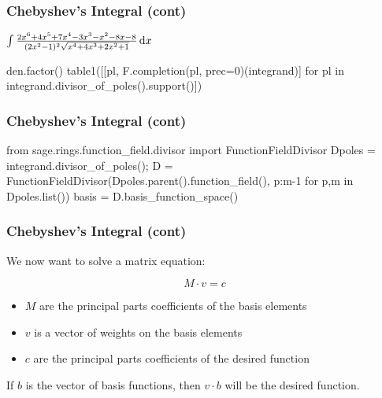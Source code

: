 \documentclass[aspectratio=169,dvipsnames]{beamer}
\newcommand{\ud}{\,\mathrm{d}}
\begin{document}
\begin{frame}[fragile]
\frametitle{Chebyshev's Integral (cont)}
\centerline{$\int {{2x^6+4x^5+7x^4-3x^3-x^2-8x-8}\over{(2x^2-1)^2\sqrt{x^4+4 x^3+2 x^2+1}}} \ud x$}

\begin{sageblock}[chebyshev]
den.factor()
table1([[pl, F.completion(pl, prec=0)(integrand)] for pl in integrand.divisor_of_poles().support()])
\end{sageblock}

\end{frame}

\begin{frame}[fragile]
\frametitle{Chebyshev's Integral (cont)}

\begin{sageblock}[chebyshev]
from sage.rings.function_field.divisor import FunctionFieldDivisor
Dpoles = integrand.divisor_of_poles();
D = FunctionFieldDivisor(Dpoles.parent().function_field(), {p:m-1 for p,m in Dpoles.list()})
basis = D.basis_function_space()
\end{sageblock}

\end{frame}

\begin{frame}[fragile]
\frametitle{Chebyshev's Integral (cont)}

We now want to solve a matrix equation:

$$M \cdot v = c$$

\begin{itemize}
\item $M$ are the principal parts coefficients of the basis elements
\item $v$ is a vector of weights on the basis elements
\item $c$ are the principal parts coefficients of the desired function
\end{itemize}

If $b$ is the vector of basis functions, then $v\cdot b$ will be the desired function.

\end{frame}
\end{document}
